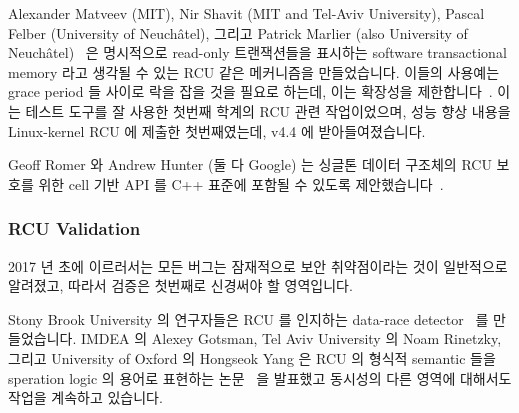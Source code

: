 Alexander Matveev (MIT), Nir Shavit (MIT and Tel-Aviv University),
Pascal Felber (University of Neuch\^{a}tel), 그리고 Patrick Marlier (also
University of Neuch\^{a}tel)~\cite{Matveev:2015:RLS:2815400.2815406}
은 명시적으로 read-only 트랜잭션들을 표시하는 software transactional memory
라고 생각될 수 있는 RCU 같은 메커니즘을 만들었습니다.
이들의 사용예는 grace period 들 사이로 락을 잡을 것을 필요로 하는데, 이는
확장성을
제한합니다~\cite{PaulEMcKenney2015ReadMostly,PaulEMcKenney2015ReadMostlySidebar}.
이는  테스트 도구를 잘 사용한 첫번째 학계의 RCU 관련
작업이었으며, 성능 향상 내용을 Linux-kernel RCU 에 제출한 첫번째였는데, v4.4 에
받아들여졌습니다.

Geoff Romer 와 Andrew Hunter (둘 다 Google) 는 싱글톤 데이터 구조체의 RCU
보호를 위한 cell 기반 API 를 C++ 표준에 포함될 수 있도록
제안했습니다~\cite{GeoffRomer2017C++DeferredReclamation}.
\iffalse

Alexander Matveev (MIT), Nir Shavit (MIT and Tel-Aviv University),
Pascal Felber (University of Neuch\^{a}tel), and Patrick Marlier (also
University of Neuch\^{a}tel)~\cite{Matveev:2015:RLS:2815400.2815406}
produced an RCU-like mechanism that can be thought of as
software transactional memory that explicitly marks
read-only transactions.
Their use cases require holding locks across grace periods, which limits
scalability~\cite{PaulEMcKenney2015ReadMostly,PaulEMcKenney2015ReadMostlySidebar}.
This appears to be the first academic RCU-related work to
make good use of the \co{rcutorture} test suite, and also the
first to have submitted a performance improvement to Linux-kernel
RCU, which was accepted into v4.4.

Geoff Romer and Andrew Hunter (both at Google) proposed a cell-based API for RCU
protection of singleton data structures for inclusion in the
C++ standard~\cite{GeoffRomer2017C++DeferredReclamation}.
\fi

\subsubsection{RCU Validation}
\label{sec:defer:RCU Validation}

2017 년 초에 이르러서는 모든 버그는 잠재적으로 보안 취약점이라는 것이
일반적으로 알려졌고, 따라서 검증은 첫번째로 신경써야 할 영역입니다.

Stony Brook University 의 연구자들은 RCU 를 인지하는 data-race
detector~\cite{AbhinavDuggal2010Masters,JustinSeyster2012PhD,Seyster:2011:RFA:2075416.2075425}
를 만들었습니다.
IMDEA 의 Alexey Gotsman, Tel Aviv University 의 Noam Rinetzky, 그리고
University of Oxford 의 Hongseok Yang 은 RCU 의 형식적 semantic 들을 speration
logic 의 용어로 표현하는 논문~\cite{AlexeyGotsman2012VerifyGraceExtended} 을
발표했고 동시성의 다른 영역에 대해서도 작업을 계속하고 있습니다.
\iffalse

